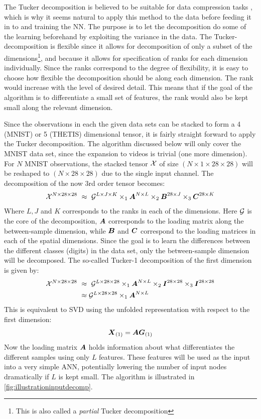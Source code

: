The Tucker decomposition is believed to be suitable for data compression tasks \cite{Mørup2011}, which is why it seems natural to apply this method to the data before feeding it in to and training the NN. The purpose is to let the decomposition do some of the learning beforehand by exploiting the variance in the data. The Tucker-decomposition is flexible since it allows for decomposition of only a subset of the dimensions\footnote{This is also called a \textit{partial} Tucker decomposition}, and because it allows for specification of ranks for each dimension individually. Since the ranks correspond to the degree of flexibility, it is easy to choose how flexible the decomposition should be along each dimension. The rank would increase with the level of desired detail. This means that if the goal of the algorithm is to differentiate a small set of features, the rank would also be kept small along the relevant dimension.

Since the observations in each the given data sets can be stacked to form a 4 (MNIST) or 5 (THETIS) dimensional tensor, it is fairly straight forward to apply the Tucker decomposition. The algorithm discussed below will only cover the MNIST data set, since the expansion to videos is trivial (one more dimension). For $N$ MNIST observations, the stacked tensor $\mathcal{X}$ of size $(N \times 1 \times 28 \times 28)$ will be reshaped to $(N\times 28 \times 28)$ due to the single input channel. The decomposition of the now 3rd order tensor becomes:
\begin{equation}
    \mathcal{X}^{N\times 28 \times 28} \ \approx \  \mathcal{G}^{L\times J \times K} \times_1 \boldsymbol{A}^{N\times L} \times_2 \boldsymbol{B}^{28 \times J} \times_3 \boldsymbol{C}^{28 \times K}
\end{equation}
Where $L, J$ and $K$ corresponds to the ranks in each of the dimensions. Here $\mathcal{G}$ is the core of the decomposition, $\boldsymbol{A}$ corresponds to the loading matrix along the between-sample dimension, while $\boldsymbol{B}$ and $\boldsymbol{C}$ correspond to the loading matrices in each of the spatial dimensions. Since the goal is to learn the differences between the different classes (digits) in the data set, only the between-sample dimension will be decomposed. The so-called Tucker-1 decomposition of the first dimension is given by:
\begin{align}
    \mathcal{X}^{N\times 28 \times 28} \ &\approx \  \mathcal{G}^{L\times 28 \times 28} \times_1 \boldsymbol{A}^{N\times L} \times_2 \boldsymbol{I}^{28 \times 28} \times_3 \boldsymbol{I}^{28 \times 28} \\
    &\approx \mathcal{G}^{L\times 28 \times 28} \times_1 \boldsymbol{A}^{N\times L}
\end{align}
This is equivalent to SVD using the unfolded representation with respect to the first dimension:
\begin{equation}
    \boldsymbol{X}_{(1)} = \boldsymbol{A} \boldsymbol{G}_{(1)}
    \label{eq:tuckerMNISTinput}
\end{equation}
Now the loading matrix $\boldsymbol{A}$ holds information about what differentiates the different samples using only $L$ features. These features will be used as the input into a very simple ANN, potentially lowering the number of input nodes dramatically if $L$ is kept small. The algorithm is illustrated in \autoref{fig:illustrationinputdecomp}.

